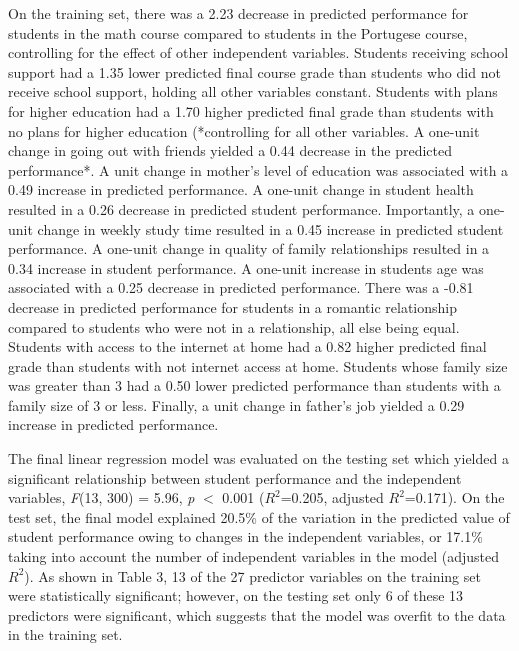\documentclass[sigconf]{acmart}
\begin{document}
On the training set, there was a 2.23 decrease in predicted performance 
for students in the math course compared to students in the Portugese course, 
controlling for the effect of other independent variables. Students receiving 
school support had a 1.35 lower predicted final course grade than students 
who did not receive school support, holding all other variables constant. 
Students with plans for higher education had a 1.70 higher predicted final 
grade than students with no plans for higher education (*controlling for 
all other variables. A one-unit change in going out with friends yielded 
a 0.44 decrease in the predicted performance*. A unit change in mother's 
level of education was associated with a 0.49 increase in predicted performance.
A one-unit change in student health resulted in a 0.26 decrease in predicted 
student performance. Importantly, a one-unit change in weekly study time 
resulted in a 0.45 increase in predicted student performance. A one-unit 
change in quality of family relationships resulted in a 0.34 increase in 
student performance. A one-unit increase in students age was associated with
a 0.25 decrease in predicted performance. There was a -0.81 decrease in 
predicted performance for students in a romantic relationship compared to 
students who were not in a relationship, all else being equal. Students with 
access to the internet at home had a 0.82 higher predicted final grade than 
students with not internet access at home. Students whose family size was
greater than 3 had a 0.50 lower predicted performance than students with 
a family size of 3 or less. Finally, a unit change in father's job yielded 
a 0.29 increase in predicted performance. 


The final linear regression model was evaluated on the testing set which
yielded a significant relationship between student performance and the 
independent variables, \textit{F}(13, 300) = 5.96, \textit{p} $<$ 0.001
($R^2$=0.205, adjusted $R^2$=0.171). On the test set, the final model explained 
20.5\% of the variation in the predicted value of student performance owing 
to changes in the independent variables, or 17.1\% taking into account the 
number of independent variables in the model (adjusted $R^2$). As shown in 
Table 3, 13 of the 27 predictor variables on the training set were 
statistically significant; however, on the testing set only 6 of these 13 
predictors were significant, which suggests that the model was overfit to 
the data in the training set. 
\end{document}
